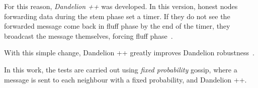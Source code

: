 For this reason, \textit{Dandelion ++} was developed. In this version, honest nodes forwarding data during the stem phase set a timer. If they do not see the forwarded message come back in fluff phase by the end of the timer, they broadcast the message themselves, forcing fluff phase~\cite{dandplus}.

With this simple change, Dandelion ++ greatly improves Dandelion robustness~\cite{lunes-dissemination}.\par

In this work, the tests are carried out using \textit{fixed probability} gossip, where a message is sent to each neighbour with a fixed probability, and Dandelion ++.